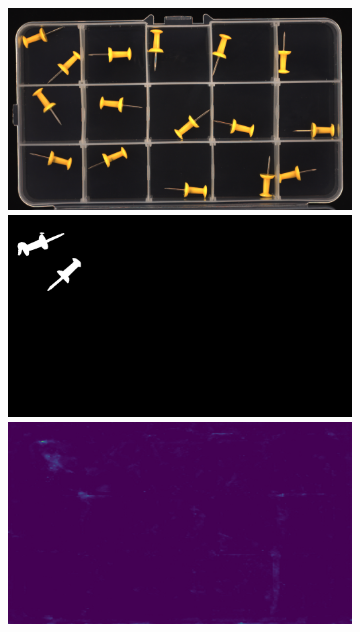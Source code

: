 \begin{figure}[H]
    \begin{subfigure}[b]{\textwidth}
        \centering
        \begin{minipage}{0.45\textwidth}
            \centering
            \includegraphics[width=\textwidth]{figures/appendix/appendix_DRAEM/PP/l010.png}
            \includegraphics[width=\textwidth]{figures/appendix/appendix_DRAEM/PP/10_m.png}
            \includegraphics[width=\textwidth]{figures/appendix/appendix_DRAEM/PP/logical10.png}

\end{minipage}
\end{subfigure}
\end{figure}

